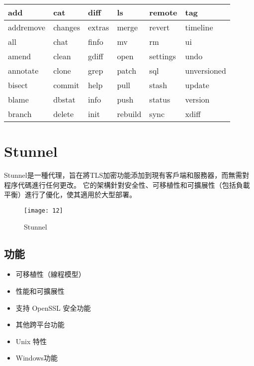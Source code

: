 \par
\begin{center}
\begin{tabular}{|p{2cm}|p{2cm}|p{2cm}|p{2cm}|p{2cm}|p{2cm}|} %
\hline
add          &cat          &diff         &ls           &remote       &tag
\\
\hline
addremove    &changes      &extras       &merge        &revert       &timeline
\\
\hline
all          &chat         &finfo        &mv           &rm           &ui
\\
\hline
amend        &clean        &gdiff        &open         &settings     &undo
\\
\hline
annotate     &clone        &grep         &patch        &sql          &unversioned
\\
\hline
bisect       &commit       &help         &pull         &stash        &update
\\
\hline
blame        &dbstat       &info         &push         &status       &version
\\
\hline
branch       &delete       &init         &rebuild      &sync         &xdiff
\\
\hline
\end{tabular}
\end{center}

\clearpage %
\renewcommand{\baselinestretch}{20} %
\section{Stunnel}
\par
\renewcommand{\baselinestretch}{1} %
\twelve Stunnel是一種代理，旨在將TLS加密功能添加到現有客戶端和服務器，而無需對程序代碼進行任何更改。 它的架構針對安全性、可移植性和可擴展性（包括負載平衡）進行了優化，使其適用於大型部署。
\\
\par
\renewcommand{\baselinestretch}{1.7} %
\begin{figure}[hbt!]
\begin{center}
\texttt{[image: 12]}
\caption{\large Stunnel}\label{fig.Stunnel}
\end{center}
\end{figure}
\par

\subsection{功能}
\renewcommand{\baselinestretch}{1} %
\begin{itemize}
	\item 可移植性（線程模型）
	\item 性能和可擴展性
	\item 支持 OpenSSL 安全功能
	\item 其他跨平台功能
	\item Unix 特性
	\item Windows功能	
\end{itemize}
\par

